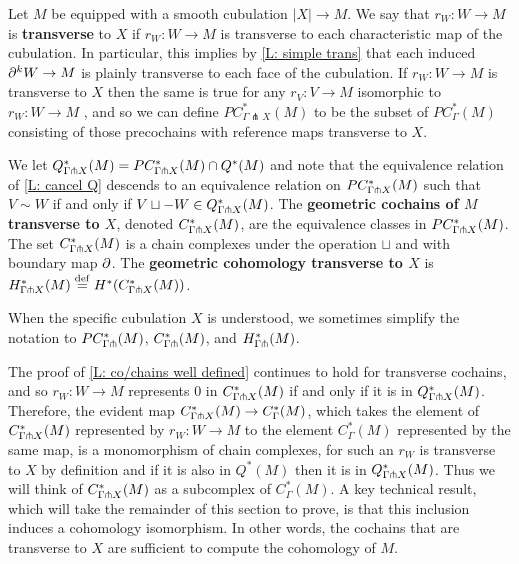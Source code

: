 \begin{definition}
Let $M$ be equipped with a smooth cubulation $|X| \to M$. We say that $r_W \colon W \to M$ is \textbf{transverse} to $X$ if $r_W: W \to M$ is transverse to each characteristic map of the cubulation. In particular, this implies by \cref{L: simple trans} that each induced $\partial^kW \to M$ is plainly transverse to each face of the cubulation. If $r_W \colon W \to M$ is transverse to $X$ then the same is true for any $r_V \colon V \to M$ isomorphic to $r_W \colon W \to M$ , and so we can define $PC^*_{\Gamma \pitchfork X}(M)$ to be the subset of $PC^*_{\Gamma}(M)$ consisting of those precochains with reference maps transverse to $X$.

We let $Q^*_{\Gamma \pitchfork X}(M) = PC_{\Gamma\pitchfork X}^*(M) \cap Q^*(M)$ and note that the equivalence relation of \cref{L: cancel Q} descends to an equivalence relation on $PC_{\Gamma\pitchfork X}^*(M)$ such that $V\sim W$ if and only if $V\sqcup -W \in Q^*_{\Gamma \pitchfork X}(M)$. The \textbf{geometric cochains of $M$ transverse to $X$}, denoted $C_{\Gamma\pitchfork X}^*(M)$, are the equivalence classes in $PC_{\Gamma\pitchfork X}^*(M)$. The set $C_{\Gamma\pitchfork X}^*(M)$ is a chain complexes under the operation $\sqcup$ and with boundary map $\partial$. The \textbf{geometric cohomology transverse to $X$} is $H_{\Gamma\pitchfork X}^*(M) \stackrel{\mathrm{def}}{=} H^*(C_{\Gamma\pitchfork X}^*(M))$.

When the specific cubulation $X$ is understood, we sometimes simplify the notation to $PC_{\Gamma\pitchfork}^*(M)$, $C_{\Gamma\pitchfork}^*(M)$, and $H_{\Gamma\pitchfork}^*(M)$.
\end{definition}


The proof of \cref{L: co/chains well defined} continues to hold for transverse cochains, and so $r_W \colon W \to M$ represents $0$ in $C^*_{\Gamma\pitchfork X}(M)$ if and only if it is in $Q^*_{\Gamma \pitchfork X}(M)$. Therefore, the evident map $C^*_{\Gamma\pitchfork X}(M) \to C^*_\Gamma(M)$, which takes the element of $C^*_{\Gamma\pitchfork X}(M)$ represented by $r_W \colon W \to M$ to the element $C^*_\Gamma(M)$ represented by the same map, is a monomorphism of chain complexes, for such an $r_W$ is transverse to $X$ by definition and if it is also in $Q^*(M)$ then it is in $Q^*_{\Gamma \pitchfork X}(M)$. Thus we will think of $C^*_{\Gamma\pitchfork X}(M)$ as a subcomplex of $C^*_\Gamma(M)$.
A key technical result, which will take the remainder of this section to prove,
is that this inclusion induces a cohomology isomorphism. In other words, the cochains that are transverse to $X$ are sufficient to compute the cohomology of $M$.

